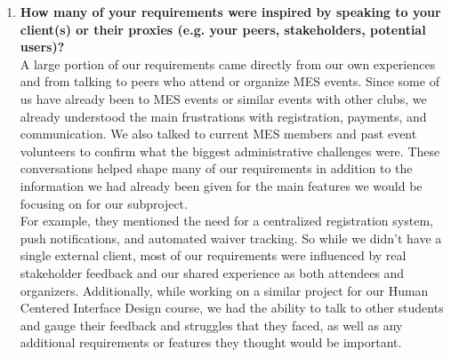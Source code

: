 \begin{enumerate}
  \item \textbf{How many of your requirements were inspired by speaking to your client(s) or their proxies (e.g. your peers, stakeholders, potential users)?} \\ 
  A large portion of our requirements came directly from our own experiences and from talking to peers who attend or organize MES events. Since some of us have already been to MES events or similar events with other clubs, we already understood the main frustrations with registration, payments, and communication. We also talked to current MES members and past event volunteers to confirm what the biggest administrative challenges were. These conversations helped shape many of our requirements in addition to the information we had already been given for the main features we would be focusing on for our subproject.\\
  For example, they mentioned the need for a centralized registration system, push notifications, and automated waiver tracking. So while we didn’t have a single external client, most of our requirements were influenced by real stakeholder feedback and our shared experience as both attendees and organizers. Additionally, while working on a similar project for our Human Centered Interface Design course, we had the ability to talk to other students and gauge their feedback and struggles that they faced, as well as any additional requirements or features they thought would be important.


\end{enumerate}
